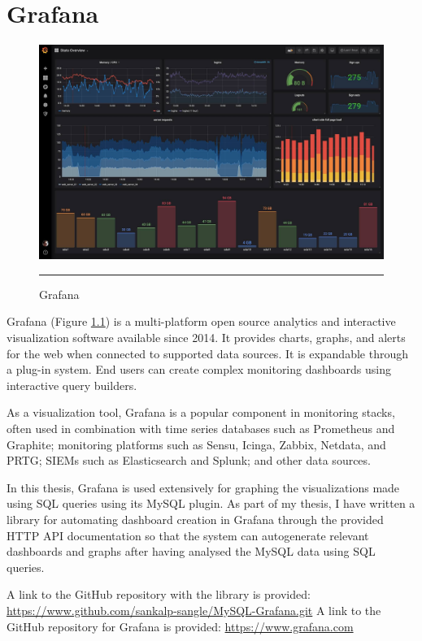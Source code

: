 
\chapter{Grafana} %

\label{AppendixB} %


\begin{figure}[b]
	\centering
		\includegraphics[width=1.0\columnwidth]{Figures/grafana.jpg}
		\rule{35em}{0.5pt}
	\caption[Grafana]{Grafana}
	\label{fig:Grafana}
\end{figure}

Grafana (Figure \ref{fig:Grafana}) is a multi-platform open source analytics and interactive visualization software available since 2014. It provides charts, graphs, and alerts for the web when connected to supported data sources. It is expandable through a plug-in system. End users can create complex monitoring dashboards using interactive query builders.

As a visualization tool, Grafana is a popular component in monitoring stacks, often used in combination with time series databases such as Prometheus and Graphite; monitoring platforms such as Sensu, Icinga, Zabbix, Netdata, and PRTG; SIEMs such as Elasticsearch and Splunk; and other data sources.

In this thesis, Grafana is used extensively for graphing the visualizations made using SQL queries using its MySQL plugin.
As part of my thesis, I have written a library for automating dashboard creation in Grafana through the provided HTTP API documentation so that the system can autogenerate
relevant dashboards and graphs after having analysed the MySQL data using SQL queries.

A link to the GitHub repository with the library is provided:
\newline
\url{https://www.github.com/sankalp-sangle/MySQL-Grafana.git}
\newline
A link to the GitHub repository for Grafana is provided:
\newline
\url{https://www.grafana.com}



